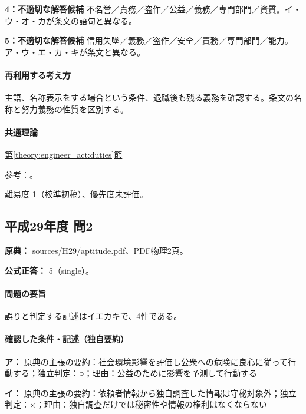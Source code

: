 \noindent\textbf{4：不適切な解答候補} 不名誉／責務／盗作／公益／義務／専門部門／資質。イ・ウ・オ・カが条文の語句と異なる。\par

\noindent\textbf{5：不適切な解答候補} 信用失墜／義務／盗作／安全／責務／専門部門／能力。ア・ウ・エ・カ・キが条文と異なる。\par

\paragraph{再利用する考え方} 主語、名称表示をする場合という条件、退職後も残る義務を確認する。条文の名称と努力義務の性質を区別する。

\paragraph{共通理論} \hyperref[theory:engineer_act:duties]{第\ref*{theory:engineer_act:duties}節}

\par 参考：\cite{engineer_act_current}。

\par 難易度 1（校準初稿）、優先度未評価。

\subsection{平成29年度 問2}
\label{q:h29-reg-apt-02}

\noindent\textbf{原典：} sources/H29/aptitude.pdf、PDF物理2頁。

\textbf{公式正答：} 5（single）。

\paragraph{問題の要旨} 誤りと判定する記述はイエカキで、4件である。

\paragraph{確認した条件・記述（独自要約）}\mbox{}\par

\noindent\textbf{ア：} 原典の主張の要約：社会環境影響を評価し公衆への危険に良心に従って行動する；独立判定：○；理由：公益のために影響を予測して行動する\par

\noindent\textbf{イ：} 原典の主張の要約：依頼者情報から独自調査した情報は守秘対象外；独立判定：×；理由：独自調査だけでは秘密性や情報の権利はなくならない\par

